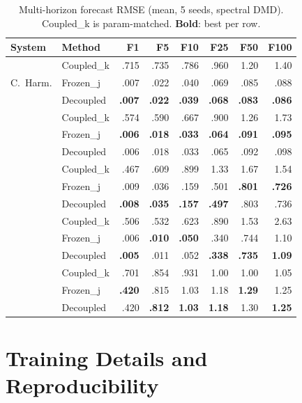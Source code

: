 \documentclass{article}
\begin{document}
\begin{table}[H]
\caption{Multi-horizon forecast RMSE (mean, 5 seeds, spectral DMD).
Coupled\_k is param-matched.  \textbf{Bold}: best per row.}
\label{tab:multi-horizon}
\centering
\small
\setlength{\tabcolsep}{3pt}
\begin{tabular}{ll rrrrrr}
\toprule
System & Method & F1 & F5 & F10 & F25 & F50 & F100 \\
\midrule
\multirow{3}{*}{C.~Harm.}
  & Coupled\_k & .715 & .735 & .786 & .960 & 1.20 & 1.40 \\
  & Frozen\_j  & .007 & .022 & .040 & .069 & .085 & .088 \\
  & Decoupled  & \textbf{.007} & \textbf{.022} & \textbf{.039} & \textbf{.068} & \textbf{.083} & \textbf{.086} \\
\addlinespace
\multirow{3}{*}{Lin.~5D}
  & Coupled\_k & .574 & .590 & .667 & .900 & 1.26 & 1.73 \\
  & Frozen\_j  & \textbf{.006} & \textbf{.018} & \textbf{.033} & \textbf{.064} & \textbf{.091} & \textbf{.095} \\
  & Decoupled  & .006 & .018 & .033 & .065 & .092 & .098 \\
\addlinespace
\multirow{3}{*}{Bruss.}
  & Coupled\_k & .467 & .609 & .899 & 1.33 & 1.67 & 1.54 \\
  & Frozen\_j  & .009 & .036 & .159 & .501 & \textbf{.801} & \textbf{.726} \\
  & Decoupled  & \textbf{.008} & \textbf{.035} & \textbf{.157} & \textbf{.497} & .803 & .736 \\
\addlinespace
\multirow{3}{*}{Duffing}
  & Coupled\_k & .506 & .532 & .623 & .890 & 1.53 & 2.63 \\
  & Frozen\_j  & .006 & \textbf{.010} & \textbf{.050} & .340 & .744 & 1.10 \\
  & Decoupled  & \textbf{.005} & .011 & .052 & \textbf{.338} & \textbf{.735} & \textbf{1.09} \\
\addlinespace
\multirow{3}{*}{L-96}
  & Coupled\_k & .701 & .854 & .931 & 1.00 & 1.00 & 1.05 \\
  & Frozen\_j  & \textbf{.420} & .815 & 1.03 & 1.18 & \textbf{1.29} & 1.25 \\
  & Decoupled  & .420 & \textbf{.812} & \textbf{1.03} & \textbf{1.18} & 1.30 & \textbf{1.25} \\
\bottomrule
\end{tabular}
\end{table}


\section{Training Details and Reproducibility}
\label{app:training}
\end{document}
